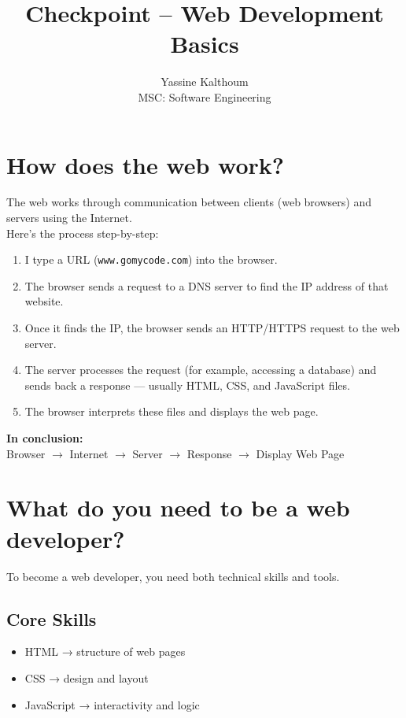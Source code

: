 \documentclass[12pt,a4paper]{article}
\title{\textbf{Checkpoint – Web Development Basics}}
\author{Yassine Kalthoum \\ MSC: Software Engineering}
\date{}
\begin{document}
\maketitle
\thispagestyle{empty}
\newpage

\section{How does the web work?}

The web works through communication between clients (web browsers) and servers using the Internet.\\[0.3cm]
Here’s the process step-by-step:

\begin{enumerate}
    \item I type a URL (\texttt{www.gomycode.com}) into the browser.
    \item The browser sends a request to a DNS server to find the IP address of that website.
    \item Once it finds the IP, the browser sends an HTTP/HTTPS request to the web server.
    \item The server processes the request (for example, accessing a database) and sends back a response — usually HTML, CSS, and JavaScript files.
    \item The browser interprets these files and displays the web page.
\end{enumerate}

\noindent
\textbf{In conclusion:}\\
Browser $\rightarrow$ Internet $\rightarrow$ Server $\rightarrow$ Response $\rightarrow$ Display Web Page

\newpage

\section{What do you need to be a web developer?}

To become a web developer, you need both technical skills and tools.

\subsection*{Core Skills}
\begin{itemize}
    \item HTML → structure of web pages
    \item CSS → design and layout
    \item JavaScript → interactivity and logic
\end{itemize}
\end{document}
